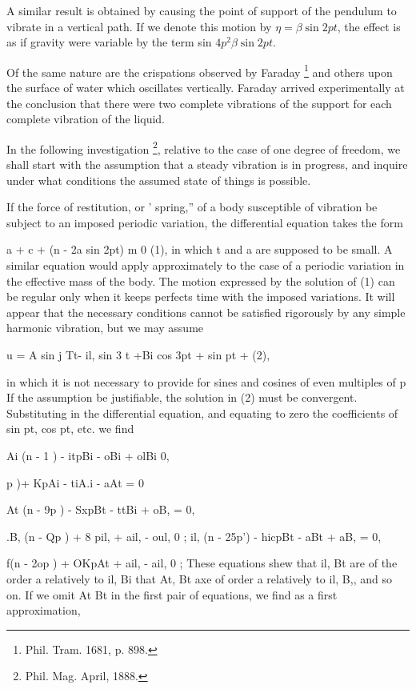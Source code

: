 A similar result is obtained by causing the point of support of the
pendulum to vibrate in a vertical path. If we denote this motion by
\( \eta = \beta \sin 2 p t\),
the effect is as if gravity were variable by the term sin
\( 4 p^2  \beta \sin 2 p t\).

Of the same nature are the crispations observed by Faraday
\footnote{Phil. Tram. 1681, p. 898.} and others
upon the surface of water which oscillates vertically. Faraday arrived
experimentally at the conclusion that there were two complete vibrations
of the support for each complete vibration of the liquid.

In the following investigation \footnote{Phil. Mag. April, 1888.},
relative to the case of one degree of
freedom, we shall start with the assumption that a steady vibration is
in progress, and inquire under what conditions the assumed state of
things is possible.


If the force of restitution, or ' spring,'' of a body susceptible of
vibration be subject to an imposed periodic variation, the differential
equation takes the form

a + c + (n - 2a sin 2pt) m 0 (1),
in which t and
a are supposed to be small. A similar equation would apply approximately
to the case of a periodic variation in the effective mass of the body.
The motion expressed by the solution of (1) can be regular only when it
keeps perfects time with the imposed variations. It will appear that
the necessary conditions cannot be satisfied rigorously by any simple
harmonic vibration, but we may assume

u = A  sin j
Tt- il, sin 3 t +Bi cos 3pt + sin pt + (2),

in which it is not necessary
to provide for sines and cosines of even multiples of p If the
assumption be justifiable, the solution in (2) must be convergent.
Substituting in the differential equation, and equating to zero the
coefficients of sin pt, cos pt, etc. we find

Ai (n - 1 ) - itpBi - oBi + olBi 0,

p )+ KpAi - tiA.i - aAt = 0

At (n - 9p ) - SxpBt - ttBi + oB, = 0,

.B, (n - Qp ) + 8 pil, + ail, - oul, 0 ; il, (n - 25p') - hicpBt - aBt +
aB, = 0,

f(n - 2op ) + OKpAt + ail, - ail, 0 ; These equations shew that il, Bt
are of the order a relatively to il, Bi that At, Bt axe of order a
relatively to il, B,, and so on. If we omit At Bt in the first pair of
equations, we find as a first approximation,

